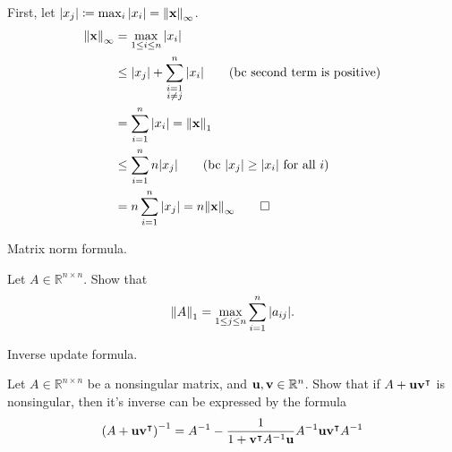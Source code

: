 \documentclass[boxes]{homework}
\newcommand{\tpose}[1]{#1^\intercal}
\newcommand{\inv}[1]{#1^{-1}}
\begin{document}
\begin{solution}
	First, let $\abs{x_j} \coloneqq \max_i \abs{x_i} = \norm{\vb{x}}_\infty$.
	\begin{align*}
		\norm{\vb{x}}_\infty & = \max_{1\leq i\leq n}\abs{x_i}                                                \\
		                     & \leq \abs{x_j} + \sum_{\substack{i = 1                                         \\ i\neq j}}^n\abs{x_i} \tag{bc second term is positive} \\
		                     & = \sum_{i=1}^n \abs{x_i} = \norm{\vb{x}}_1                                     \\
		                     & \leq \sum_{i = 1}^n n\abs{x_j} \tag{bc $\abs{x_j} \geq \abs{x_i}$ for all $i$} \\
		                     & = n\sum_{i = 1}	^n \abs{x_j} = n\norm{\vb{x}}_\infty \tag*{$\square$}
	\end{align*}
\end{solution}

\clearpage

\begin{problem}
Matrix norm formula.

Let $A\in\mathbb{R}^{n\times n}$. Show that
\begin{equation*}
	\norm{A}_1 = \max_{1\leq j \leq n}\sum_{i = 1}^n\abs{a_{ij}}.
\end{equation*}
\end{problem}

\clearpage

\begin{problem}
Inverse update formula.

Let $A\in\mathbb{R}^{n\times n}$ be a nonsingular matrix, and $\vb{u}, \vb{v}\in\mathbb{R}^n$. Show that if $A + \vb{u}\tpose{\vb{v}}$ is nonsingular, then it's inverse can be expressed by the formula
\begin{equation*}
	\inv{\qty(A + \vb{u}\tpose{\vb{v}})} = \inv{A} - \frac{1}{1 + \tpose{\vb{v}}\inv{A}\vb{u}}\inv{A}\vb{u}\tpose{\vb{v}}\inv{A}
\end{equation*}
\end{problem}
\end{document}

